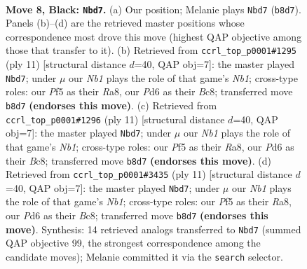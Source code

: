 \documentclass[11pt]{article}
\begin{document}
\begin{figure}[p]\centering
\begin{subfigure}{0.46\textwidth}\centering
\resizebox{\linewidth}{!}{%
\newchessgame
\chessboard[
  setfen={rnbq1rk1/1pp1p1bp/p2p1np1/5p2/1PPP3P/5NP1/P3PPB1/RNBQ1RK1 b - - 0 8},
  showmover=false,
  pgfstyle=straightmove, color=movearrow, markmove={b8-d7}
]}
\caption{}
\end{subfigure}\hfill
\begin{subfigure}{0.46\textwidth}\centering
\resizebox{\linewidth}{!}{%
\newchessgame
\chessboard[
  setfen={rnbq1rk1/ppp1ppbp/3p1np1/8/2PP4/5NP1/PP2PPBP/RNBQ1RK1 b - - 0 6},
  showmover=false,
  pgfstyle=straightmove, color=movearrow, markmove={b8-d7}
]}
\caption{}
\end{subfigure}
\\[4pt]
\begin{subfigure}{0.46\textwidth}\centering
\resizebox{\linewidth}{!}{%
\newchessgame
\chessboard[
  setfen={rnbq1rk1/ppp1ppbp/3p1np1/8/2PP4/5NP1/PP2PPBP/RNBQ1RK1 b - - 0 6},
  showmover=false,
  pgfstyle=straightmove, color=movearrow, markmove={b8-d7}
]}
\caption{}
\end{subfigure}\hfill
\begin{subfigure}{0.46\textwidth}\centering
\resizebox{\linewidth}{!}{%
\newchessgame
\chessboard[
  setfen={rnbq1rk1/ppp1ppbp/3p1np1/8/2PP4/5NP1/PP2PPBP/RNBQ1RK1 b - - 1 6},
  showmover=false,
  pgfstyle=straightmove, color=movearrow, markmove={b8-d7}
]}
\caption{}
\end{subfigure}
\caption{\textbf{Move 8, Black: \texttt{Nbd7}.} (a) Our position; Melanie plays \texttt{Nbd7} (\texttt{b8d7}). Panels (b)--(d) are the retrieved master positions whose correspondence most drove this move (highest QAP objective among those that transfer to it). (b) Retrieved from \texttt{ccrl\_top\_p0001\#1295} (ply 11) [structural distance $d$=40, QAP obj=7]: the master played \texttt{Nbd7}; under $\mu$ our \emph{Nb1} plays the role of that game's \emph{Nb1}; cross-type roles: our \emph{P}f5 as their \emph{R}a8, our \emph{P}d6 as their \emph{B}c8; transferred move \texttt{b8d7} \textbf{(endorses this move)}. (c) Retrieved from \texttt{ccrl\_top\_p0001\#1296} (ply 11) [structural distance $d$=40, QAP obj=7]: the master played \texttt{Nbd7}; under $\mu$ our \emph{Nb1} plays the role of that game's \emph{Nb1}; cross-type roles: our \emph{P}f5 as their \emph{R}a8, our \emph{P}d6 as their \emph{B}c8; transferred move \texttt{b8d7} \textbf{(endorses this move)}. (d) Retrieved from \texttt{ccrl\_top\_p0001\#3435} (ply 11) [structural distance $d$=40, QAP obj=7]: the master played \texttt{Nbd7}; under $\mu$ our \emph{Nb1} plays the role of that game's \emph{Nb1}; cross-type roles: our \emph{P}f5 as their \emph{R}a8, our \emph{P}d6 as their \emph{B}c8; transferred move \texttt{b8d7} \textbf{(endorses this move)}. Synthesis: 14 retrieved analogs transferred to \texttt{Nbd7} (summed QAP objective 99, the strongest correspondence among the candidate moves); Melanie committed it via the \texttt{search} selector.}
\label{fig:thought-m15}
\end{figure}
\end{document}
